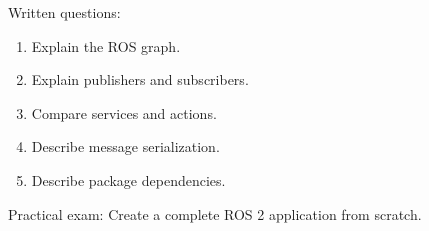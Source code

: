 \documentclass[11pt,oneside]{book}
\begin{document}
Written questions:
\begin{enumerate}
\item Explain the ROS graph.
\item Explain publishers and subscribers.
\item Compare services and actions.
\item Describe message serialization.
\item Describe package dependencies.
\end{enumerate}

Practical exam:
Create a complete ROS 2 application from scratch.
\end{document}

